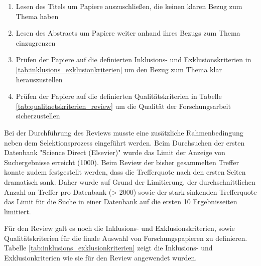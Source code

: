 \begin{enumerate}
    \item Lesen des Titels um Papiere auszuschließen, die keinen klaren Bezug zum Thema haben
    \item Lesen des Abstracts um Papiere weiter anhand ihres Bezugs zum Thema einzugrenzen
    \item Prüfen der Papiere auf die definierten Inklusions- und Exklusionskriterien in \ref{tab:inklusions_exklusionkriterien} um den Bezug zum Thema klar herauszustellen
    \item Prüfen der Papiere auf die definierten Qualitätskriterien in Tabelle \ref{tab:qualitaetskriterien_review} um die Qualität der Forschungsarbeit sicherzustellen
\end{enumerate}

Bei der Durchführung des Reviews musste eine zusätzliche Rahmenbedingung neben dem Selektionsprozess eingeführt werden. Beim Durchsuchen der ersten Datenbank "Science Direct (Elsevier)" wurde das Limit der Anzeige von Suchergebnisse erreicht (1000). Beim Review der bisher gesammelten Treffer konnte zudem festgestellt werden, dass die Trefferquote nach den ersten Seiten dramatisch sank. Daher wurde auf Grund der Limitierung, der durchschnittlichen Anzahl an Treffer pro Datenbank (> 2000) sowie der stark sinkenden Trefferquote das Limit für die Suche in einer Datenbank auf die ersten 10 Ergebnisseiten limitiert.

Für den Review galt es noch die Inklusions- und Exklusionskriterien, sowie Qualitätskriterien für die finale Auswahl von Forschungspapieren zu definieren. Tabelle \ref{tab:inklusions_exklusionkriterien} zeigt die Inklusions- und Exklusionkriterien wie sie für den Review angewendet wurden.

